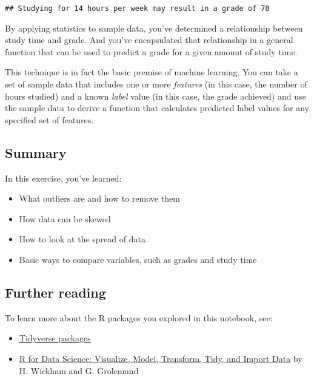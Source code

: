 \documentclass[
]{article}
\providecommand{\tightlist}{%
  \setlength{\itemsep}{0pt}\setlength{\parskip}{0pt}}
\begin{document}
\begin{verbatim}
## Studying for 14 hours per week may result in a grade of 70
\end{verbatim}

By applying statistics to sample data, you've determined a relationship
between study time and grade. And you've encapsulated that relationship
in a general function that can be used to predict a grade for a given
amount of study time.

This technique is in fact the basic premise of machine learning. You can
take a set of sample data that includes one or more \emph{features} (in
this case, the number of hours studied) and a known \emph{label} value
(in this case, the grade achieved) and use the sample data to derive a
function that calculates predicted label values for any specified set of
features.

\hypertarget{summary}{%
\subsection{Summary}\label{summary}}

In this exercise, you've learned:

\begin{itemize}
\tightlist
\item
  What outliers are and how to remove them
\item
  How data can be skewed
\item
  How to look at the spread of data
\item
  Basic ways to compare variables, such as grades and study time
\end{itemize}

\hypertarget{further-reading}{%
\subsection{Further reading}\label{further-reading}}

To learn more about the R packages you explored in this notebook, see:

\begin{itemize}
\tightlist
\item
  \href{https://www.tidyverse.org/packages/}{Tidyverse packages}
\item
  \href{https://r4ds.had.co.nz/}{R for Data Science: Visualize, Model,
  Transform, Tidy, and Import Data} by H. Wickham and G. Grolemund
\end{itemize}
\end{document}
